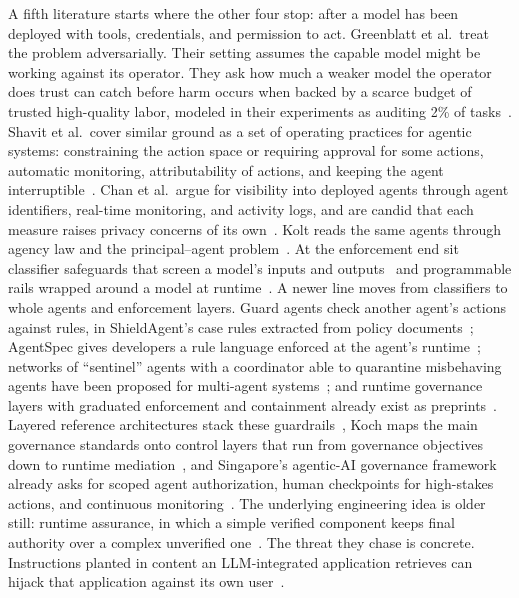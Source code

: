 \documentclass{ieeeaccess}
\begin{document}
A fifth literature starts where the other four stop: after a model has been deployed with tools, credentials, and permission to act. Greenblatt et al.\ treat the problem adversarially. Their setting assumes the capable model might be working against its operator. They ask how much a weaker model the operator does trust can catch before harm occurs when backed by a scarce budget of trusted high-quality labor, modeled in their experiments as auditing 2\% of tasks~\cite{greenblatt2024aicontrol}.
Shavit et al.\ cover similar ground as a set of operating practices for agentic systems: constraining the action space or requiring approval for some actions, automatic monitoring, attributability of actions, and keeping the agent interruptible~\cite{shavit2023agentic}.
Chan et al.\ argue for visibility into deployed agents through agent identifiers, real-time monitoring, and activity logs, and are candid that each measure raises privacy concerns of its own~\cite{chan2024visibility}.
Kolt reads the same agents through agency law and the principal--agent problem~\cite{kolt2025agents}.
At the enforcement end sit classifier safeguards that screen a model's inputs and outputs~\cite{inan2023llamaguard,sharma2025constitutionalclassifiers}
and programmable rails wrapped around a model at runtime~\cite{rebedea2023nemo}.
A newer line moves from classifiers to whole agents and enforcement layers. Guard agents check another agent's actions against rules, in ShieldAgent's case rules extracted from policy documents~\cite{xiang2025guardagent,chen2025shieldagent};
AgentSpec gives developers a rule language enforced at the agent's runtime~\cite{wang2026agentspec};
networks of ``sentinel'' agents with a coordinator able to quarantine misbehaving agents have been proposed for multi-agent systems~\cite{gosmar2025sentinel};
and runtime governance layers with graduated enforcement and containment already exist as preprints~\cite{gaurav2025gaas,wang2025mi9}.
Layered reference architectures stack these guardrails~\cite{shamsujjoha2025swiss},
Koch maps the main governance standards onto control layers that run from governance objectives down to runtime mediation~\cite{koch2026layered},
and Singapore's agentic-AI governance framework already asks for scoped agent authorization, human checkpoints for high-stakes actions, and continuous monitoring~\cite{imda2026agentic}.
The underlying engineering idea is older still: runtime assurance, in which a simple verified component keeps final authority over a complex unverified one~\cite{sha2001simplex,alshiekh2018shielding}.
The threat they chase is concrete. Instructions planted in content an LLM-integrated application retrieves can hijack that application against its own user~\cite{greshake2023injection}.
\end{document}
